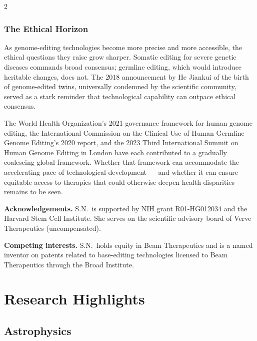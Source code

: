 \documentclass[a4paper,11pt]{article}
\begin{document}
\begin{multicols}{2}
\subsubsection{The Ethical Horizon}

As genome-editing technologies become more precise and more accessible, the
ethical questions they raise grow sharper. Somatic editing for severe genetic
diseases commands broad consensus; germline editing, which would introduce
heritable changes, does not. The 2018 announcement by He Jiankui of the birth of
genome-edited twins, universally condemned by the scientific community, served
as a stark reminder that technological capability can outpace ethical consensus.

\medskip
The World Health Organization's 2021 governance framework for human genome
editing, the International Commission on the Clinical Use of Human Germline
Genome Editing's 2020 report, and the 2023 Third International Summit on Human
Genome Editing in London have each contributed to a gradually coalescing global
framework. Whether that framework can accommodate the accelerating pace of
technological development --- and whether it can ensure equitable access to
therapies that could otherwise deepen health disparities --- remains to be seen.

\vspace{8pt}
{\sffamily\footnotesize\color{graytext}
\textbf{Acknowledgements.} S.N.\ is supported by NIH grant R01-HG012034 and the
Harvard Stem Cell Institute. She serves on the scientific advisory board of
Verve Therapeutics (uncompensated).
}

\vspace{4pt}
{\sffamily\footnotesize\color{graytext}
\textbf{Competing interests.} S.N.\ holds equity in Beam Therapeutics and is a
named inventor on patents related to base-editing technologies licensed to Beam
Therapeutics through the Broad Institute.
}

\end{multicols}

\newpage

\section{Research Highlights}

\subsection*{Astrophysics}
\end{document}
